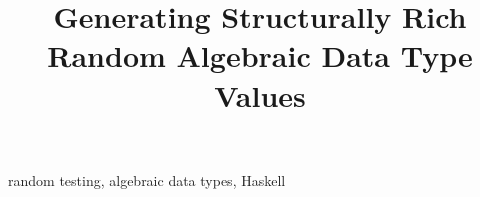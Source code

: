 \documentclass[conference, fleqn]{IEEEtran}
\begin{document}
\title{Generating Structurally Rich \\ Random Algebraic Data Type Values}

\author{
\and
{}
}

\maketitle


\newenvironment{CompactItemize}%
  {\begin{list}{$\, \  \blacktriangleright$}%
   {\leftmargin=0pt \itemsep=2pt \topsep=5pt
     \parsep=0pt \partopsep=0pt}}%
  {\end{list}}




\begin{IEEEkeywords}
random testing, algebraic data types, Haskell
\end{IEEEkeywords}












\end{document}
